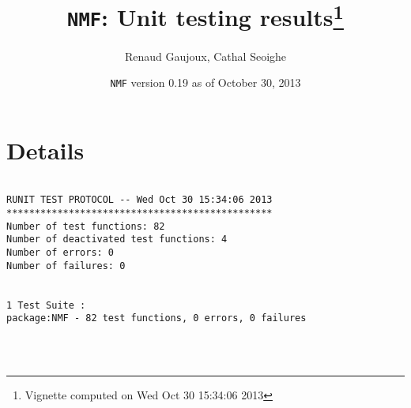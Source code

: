 \documentclass[10pt]{article}\usepackage[]{graphicx}\usepackage[]{color}
\author{Renaud Gaujoux, Cathal Seoighe}
\title{\texttt{NMF}: Unit testing results\footnote{Vignette computed  on Wed Oct 30 15:34:06 2013}}
\date{\texttt{NMF} version 0.19 as of October 30, 2013}
\begin{document}
\maketitle

\section{Details}
\begin{verbatim}

RUNIT TEST PROTOCOL -- Wed Oct 30 15:34:06 2013 
*********************************************** 
Number of test functions: 82 
Number of deactivated test functions: 4 
Number of errors: 0 
Number of failures: 0 

 
1 Test Suite : 
package:NMF - 82 test functions, 0 errors, 0 failures




\end{verbatim}
\end{document}
